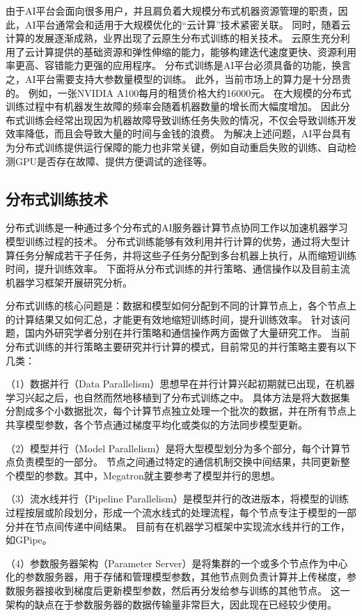 由于AI平台会面向很多用户，并且肩负着大规模分布式机器资源管理的职责，因此，AI平台通常会和适用于大规模优化的“云计算”技术紧密关联。
同时，随着云计算的发展逐渐成熟，业界出现了云原生分布式训练的相关技术。
云原生充分利用了云计算提供的基础资源和弹性伸缩的能力，能够构建迭代速度更快、资源利用率更高、容错能力更强的应用程序。
分布式训练是AI平台必须具备的功能，换言之，AI平台需要支持大参数量模型的训练。
此外，当前市场上的算力是十分昂贵的。
例如，一张NVIDIA A100每月的租赁价格大约16000元。
在大规模的分布式训练过程中有机器发生故障的频率会随着机器数量的增长而大幅度增加。
因此分布式训练会经常出现因为机器故障导致训练任务失败的情况，不仅会导致训练开发效率降低，而且会导致大量的时间与金钱的浪费。
为解决上述问题，AI平台具有为分布式训练提供运行保障的能力也非常关键，例如自动重启失败的训练、自动检测GPU是否存在故障、提供方便调试的途径等。

\subsection{分布式训练技术}
分布式训练是一种通过多个分布式的AI服务器计算节点协同工作以加速机器学习模型训练过程的技术。
分布式训练能够有效利用并行计算的优势，通过将大型计算任务分解成若干子任务，并将这些子任务分配到多台机器上执行，从而缩短训练时间，提升训练效率。
下面将从分布式训练的并行策略、通信操作以及目前主流机器学习框架开展研究分析。

分布式训练的核心问题是：数据和模型如何分配到不同的计算节点上，各个节点上的计算结果又如何汇总，才能更有效地缩短训练时间，提升训练效率。
针对该问题，国内外研究学者分别在并行策略和通信操作两方面做了大量研究工作。
当前分布式训练的并行策略主要研究并行计算的模式，目前常见的并行策略主要有以下几类：

（1）数据并行（Data Parallelism）思想早在并行计算兴起初期就已出现，在机器学习兴起之后，也自然而然地移植到了分布式训练之中。
具体方法是将大数据集分割成多个小数据批次，每个计算节点独立处理一个批次的数据，并在所有节点上共享模型参数，各个节点通过梯度平均化或类似的方法同步模型更新。

（2）模型并行（Model Parallelism）是将大型模型划分为多个部分，每个计算节点负责模型的一部分。
节点之间通过特定的通信机制交换中间结果，共同更新整个模型的参数。其中，Megatron就主要参考了模型并行的思想。

（3）流水线并行（Pipeline Parallelism）是模型并行的改进版本，将模型的训练过程按层或阶段划分，形成一个流水线式的处理流程，每个节点专注于模型的一部分并在节点间传递中间结果。
目前有在机器学习框架中实现流水线并行的工作，如GPipe。

（4）参数服务器架构（Parameter Server）是将集群的一个或多个节点作为中心化的参数服务器，用于存储和管理模型参数，其他节点则负责计算并上传梯度，参数服务器接收到梯度后更新模型参数，然后再分发给参与训练的其他节点。
这一架构的缺点在于参数服务器的数据传输量非常巨大，因此现在已经较少使用。

